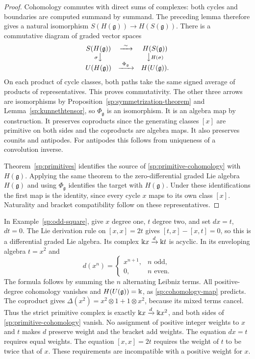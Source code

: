 \begin{proof}
Cohomology commutes with direct sums of complexes: both cycles and
boundaries are computed summand by summand.  The preceding lemma
therefore gives a natural isomorphism
$S(H(\mathfrak g))\to H(S(\mathfrak g))$.
There is a commutative diagram of graded vector spaces
\[
 \begin{array}{ccc}
 S(H(\mathfrak g))&\xrightarrow{\ \sim\ }&H(S(\mathfrak g))\\
 {\scriptstyle\sigma}\big\downarrow&&
     \big\downarrow{\scriptstyle H(\sigma)}\\
 U(H(\mathfrak g))&\xrightarrow{\ \Phi_{\mathfrak g}\ }&H(U(\mathfrak g)).
 \end{array}
\]
On each product of cycle classes, both paths take the same signed
average of products of representatives.  This proves commutativity.
The other three arrows are isomorphisms by
Proposition~\ref{sp:symmetrization-theorem} and
Lemma~\ref{sp:kunnethtensor}, so $\Phi_{\mathfrak g}$ is an isomorphism.
It is an algebra map by construction.  It preserves coproducts since
the generating classes $[x]$ are primitive on both sides and the
coproducts are algebra maps.  It also preserves counits and antipodes.
For antipodes this follows from uniqueness of a convolution inverse.

Theorem~\ref{sp:primitives} identifies the source of
\eqref{sp:primitive-cohomology} with $H(\mathfrak g)$.
Applying the same theorem to the zero-differential graded Lie algebra
$H(\mathfrak g)$ and using $\Phi_{\mathfrak g}$ identifies the target
with $H(\mathfrak g)$.  Under these identifications the first map is
the identity, since every cycle $x$ maps to its own class $[x]$.
Naturality and bracket compatibility follow on these representatives.
\end{proof}

\begin{example}\label{sp:odd-differential}
In Example~\ref{sp:odd-square}, give $x$ degree one, $t$ degree two,
and set $dx=t$, $dt=0$.  The Lie derivation rule on $[x,x]=2t$ gives
$[t,x]-[x,t]=0$, so this is a differential graded Lie algebra.
Its complex $\Bbbk x\xrightarrow{d}\Bbbk t$ is acyclic.
In its enveloping algebra $t=x^2$ and
\[
 d(x^n)=
 \begin{cases}x^{n+1},&n\text{ odd},\\0,&n\text{ even}.
 \end{cases}
\]
The formula follows by summing the $n$ alternating Leibniz terms.
All positive-degree cohomology vanishes and $H(U(\mathfrak g))=\Bbbk$,
as \eqref{sp:cohomology-map} predicts.
The coproduct gives
$\Delta(x^2)=x^2\otimes1+1\otimes x^2$, because its mixed terms cancel.
Thus the strict primitive complex is exactly
$\Bbbk x\xrightarrow{d}\Bbbk x^2$, and both sides of
\eqref{sp:primitive-cohomology} vanish.
No assignment of positive integer weights to $x$ and $t$ makes $d$
preserve weight and the bracket add weights. The equation $dx=t$
requires equal weights. The equation $[x,x]=2t$ requires the weight of
$t$ to be twice that of $x$. These requirements are incompatible with
a positive weight for $x$.
\end{example}

